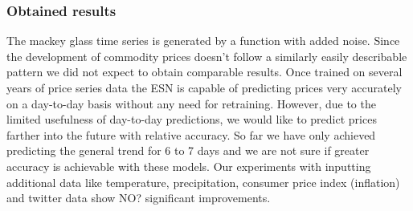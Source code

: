 \subsubsection*{Obtained results}
The mackey glass time series is generated by a function with added noise. Since the development of commodity prices doesn't follow a similarly easily describable pattern we did not expect to obtain comparable results. Once trained on several years of price series data the ESN is capable of predicting prices very accurately on a day-to-day basis without any need for retraining. However, due to the limited usefulness of day-to-day predictions, we would like to predict prices farther into the future with relative accuracy. So far we have only achieved predicting the general trend for 6 to 7 days and we are not sure if greater accuracy is achievable with these models. Our experiments with inputting additional data like temperature, precipitation, consumer price index (inflation) and twitter data show NO? significant improvements. 

